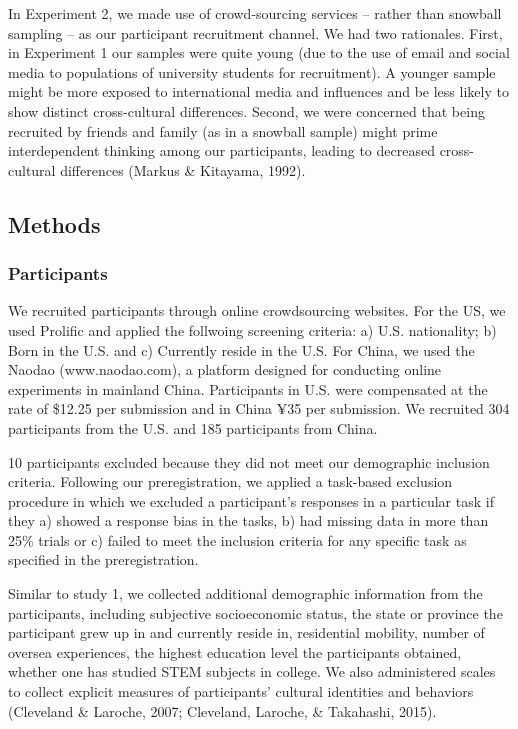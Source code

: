 \documentclass[
  man]{apa6}
\begin{document}
In Experiment 2, we made use of crowd-sourcing services -- rather than snowball sampling -- as our participant recruitment channel. We had two rationales. First, in Experiment 1 our samples were quite young (due to the use of email and social media to populations of university students for recruitment). A younger sample might be more exposed to international media and influences and be less likely to show distinct cross-cultural differences. Second, we were concerned that being recruited by friends and family (as in a snowball sample) might prime interdependent thinking among our participants, leading to decreased cross-cultural differences (Markus \& Kitayama, 1992).

\hypertarget{methods-1}{%
\subsection{Methods}\label{methods-1}}

\hypertarget{participants-1}{%
\subsubsection{Participants}\label{participants-1}}

We recruited participants through online crowdsourcing websites. For the US, we used Prolific and applied the follwoing screening criteria: a) U.S. nationality; b) Born in the U.S. and c) Currently reside in the U.S. For China, we used the Naodao (www.naodao.com), a platform designed for conducting online experiments in mainland China. Participants in U.S. were compensated at the rate of \$12.25 per submission and in China ¥35 per submission. We recruited 304 participants from the U.S. and 185 participants from China.

10 participants excluded because they did not meet our demographic inclusion criteria. Following our preregistration, we applied a task-based exclusion procedure in which we excluded a participant's responses in a particular task if they a) showed a response bias in the tasks, b) had missing data in more than 25\% trials or c) failed to meet the inclusion criteria for any specific task as specified in the preregistration.

Similar to study 1, we collected additional demographic information from the participants, including subjective socioeconomic status, the state or province the participant grew up in and currently reside in, residential mobility, number of oversea experiences, the highest education level the participants obtained, whether one has studied STEM subjects in college. We also administered scales to collect explicit measures of participants' cultural identities and behaviors (Cleveland \& Laroche, 2007; Cleveland, Laroche, \& Takahashi, 2015).
\end{document}
